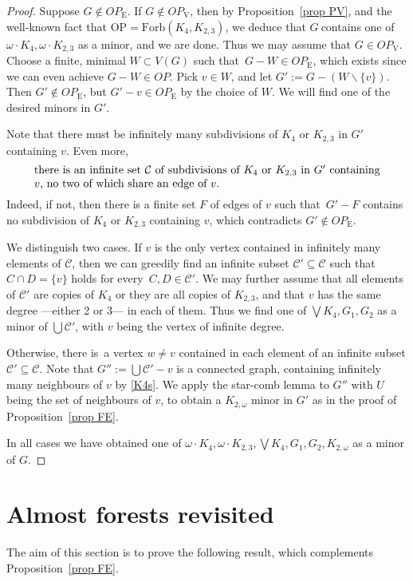 \documentclass{article}
\newcommand{\forb}[1]{\mathrm{Forb}(#1)}
\newcommand{\rmv}[1]{\ensuremath{#1_{\mathrm{V}}}}
\newcommand{\rme}[1]{\ensuremath{#1_{\mathrm{E}}}}
\newcommand{\OuPl}{\ensuremath{{\mathrm{OP}}}}
\newcommand{\omdot}{\omega \cdot}
\newcommand{\cc}{\ensuremath{\mathcal C}}
\newcommand{\sm}{\backslash}
\newcommand{\g}{\ensuremath{G\ }}
\newcommand{\G}{\ensuremath{G}}
\newcommand{\Prr}[1]{Pro\-position~\ref{#1}}
\newcommand{\fe}{for every}
\newcommand{\st}{such that}
\newcommand{\ti}{there is}
\newcommand{\labtequ}[2]{\begin{equation} \label{#1} 	\begin{minipage}[c]{0.9\textwidth}  #2 \end{minipage} \ignorespacesafterend \end{equation} }
\begin{document}
\begin{proof}
Suppose $G\not\in \rme{OP}$. If $G\not\in \rmv{OP}$, then by \Prr{prop PV}, and the well-known fact that $\OuPl=\forb{K_4, K_{2,3}}$, we deduce that \g contains one of $\omdot K_4, \omdot K_{2,3}$ as a minor, and we are done. Thus we may assume that $G\in \rmv{OP}$. Choose a finite, minimal $W\subset V(G)$ \st\ $G-W\in \rme{OP}$, which exists since we can even achieve $G-W\in {OP}$.  Pick $v\in W$, and let $G':= G - (W\sm \{v\})$. Then $G'\not\in \rme{OP}$, but $G'- v\in \rme{OP}$ by the choice of $W$. We will find one of the desired minors in $G'$.

Note that there must be infinitely many subdivisions of $K_4$ or $K_{2,3}$ in $G'$ containing $v$. Even more, 
\labtequ{K4s}{there is an infinite set $\cc$ of subdivisions of $K_4$ or $K_{2,3}$ in $G'$ containing $v$, no two of which share an edge of $v$.}
Indeed, if not, then there is a finite set $F$ of edges of $v$ \st\ $G'-F$ contains no subdivision of $K_4$ or $K_{2,3}$ containing $v$, which contradicts $G'\not\in \rme{OP}$.

We distinguish two cases. If $v$ is the only vertex contained in infinitely many elements of $\cc$, then we can greedily find an infinite subset $\cc' \subseteq \cc$ \st\ $C\cap D= \{v\}$ holds \fe\ $C,D\in \cc'$. We may further assume that all elements of $\cc'$ are copies of $K_4$ or they are all copies of $K_{2,3}$, and that $v$ has the same degree ---either 2 or 3--- in each of them. Thus we find one of $\bigvee K_4, G_1,G_2$ as a minor of $\bigcup \cc'$, with $v$ being the vertex of infinite degree. 

Otherwise, \ti\ a vertex  $w\neq v$ contained in each element of an infinite subset $\cc' \subseteq \cc$. Note that $G'':= \bigcup \cc' - v$ is a connected graph, containing infinitely many neighbours of $v$ by \eqref{K4s}. We apply the star-comb lemma  to $G''$ with $U$ being the set of neighbours of $v$, to obtain a $K_{2,\omega}$ minor in $\G'$ as in the proof of \Prr{prop FE}. 

In all cases we have obtained one of $\omdot K_4, \omdot K_{2,3}, \bigvee K_4, G_1,G_2 , K_{2,\omega}$ as a minor of \G.
\end{proof}

 
\section{Almost forests revisited} \label{sec AFR}

The aim of this section is to prove the following result, which complements \Prr{prop FE}.
\end{document}
